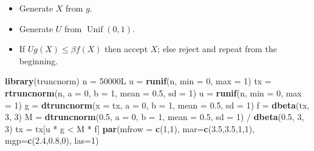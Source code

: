 \documentclass[11pt,]{article}
\newenvironment{Shaded}{\begin{snugshade}}{\end{snugshade}}
\newcommand{\KeywordTok}[1]{\textcolor[rgb]{0.13,0.29,0.53}{\textbf{{#1}}}}
\newcommand{\DataTypeTok}[1]{\textcolor[rgb]{0.13,0.29,0.53}{{#1}}}
\newcommand{\DecValTok}[1]{\textcolor[rgb]{0.00,0.00,0.81}{{#1}}}
\newcommand{\FloatTok}[1]{\textcolor[rgb]{0.00,0.00,0.81}{{#1}}}
\newcommand{\StringTok}[1]{\textcolor[rgb]{0.31,0.60,0.02}{{#1}}}
\newcommand{\NormalTok}[1]{{#1}}
\providecommand{\tightlist}{%
  \setlength{\itemsep}{0pt}\setlength{\parskip}{0pt}}
\begin{document}
\begin{itemize}
\tightlist
\item
  Generate \(X\) from \(g\).
\item
  Generate \(U\) from \(\operatorname{Unif}(0,1)\).
\item
  If \(Ug(X) \leq \beta f(X)\) then accept \(X\); else reject and repeat
  from the beginning.
\end{itemize}

\begin{Shaded}
\begin{Highlighting}[]
\KeywordTok{library}\NormalTok{(truncnorm)}
\NormalTok{n =}\StringTok{ }\NormalTok{50000L}
\NormalTok{u =}\StringTok{ }\KeywordTok{runif}\NormalTok{(n, }\DataTypeTok{min =} \DecValTok{0}\NormalTok{, }\DataTypeTok{max =} \DecValTok{1}\NormalTok{)}
\NormalTok{tx =}\StringTok{ }\KeywordTok{rtruncnorm}\NormalTok{(n, }\DataTypeTok{a =} \DecValTok{0}\NormalTok{, }\DataTypeTok{b =} \DecValTok{1}\NormalTok{, }\DataTypeTok{mean =} \FloatTok{0.5}\NormalTok{, }\DataTypeTok{sd =} \DecValTok{1}\NormalTok{)}
\NormalTok{u =}\StringTok{ }\KeywordTok{runif}\NormalTok{(n, }\DataTypeTok{min =} \DecValTok{0}\NormalTok{, }\DataTypeTok{max =} \DecValTok{1}\NormalTok{)}
\NormalTok{g =}\StringTok{ }\KeywordTok{dtruncnorm}\NormalTok{(}\DataTypeTok{x =} \NormalTok{tx, }\DataTypeTok{a =} \DecValTok{0}\NormalTok{, }\DataTypeTok{b =} \DecValTok{1}\NormalTok{, }\DataTypeTok{mean =} \FloatTok{0.5}\NormalTok{, }\DataTypeTok{sd =} \DecValTok{1}\NormalTok{)}
\NormalTok{f =}\StringTok{ }\KeywordTok{dbeta}\NormalTok{(tx, }\DecValTok{3}\NormalTok{, }\DecValTok{3}\NormalTok{)}
\NormalTok{M =}\StringTok{ }\KeywordTok{dtruncnorm}\NormalTok{(}\FloatTok{0.5}\NormalTok{, }\DataTypeTok{a =} \DecValTok{0}\NormalTok{, }\DataTypeTok{b =} \DecValTok{1}\NormalTok{, }\DataTypeTok{mean =} \FloatTok{0.5}\NormalTok{, }\DataTypeTok{sd =} \DecValTok{1}\NormalTok{) /}\StringTok{ }\KeywordTok{dbeta}\NormalTok{(}\FloatTok{0.5}\NormalTok{, }\DecValTok{3}\NormalTok{, }\DecValTok{3}\NormalTok{)}
\NormalTok{tx =}\StringTok{ }\NormalTok{tx[u *}\StringTok{ }\NormalTok{g <}\StringTok{ }\NormalTok{M *}\StringTok{ }\NormalTok{f]}
\KeywordTok{par}\NormalTok{(}\DataTypeTok{mfrow =} \KeywordTok{c}\NormalTok{(}\DecValTok{1}\NormalTok{,}\DecValTok{1}\NormalTok{), }\DataTypeTok{mar=}\KeywordTok{c}\NormalTok{(}\FloatTok{3.5}\NormalTok{,}\FloatTok{3.5}\NormalTok{,}\DecValTok{1}\NormalTok{,}\DecValTok{1}\NormalTok{), }\DataTypeTok{mgp=}\KeywordTok{c}\NormalTok{(}\FloatTok{2.4}\NormalTok{,}\FloatTok{0.8}\NormalTok{,}\DecValTok{0}\NormalTok{), }\DataTypeTok{las=}\DecValTok{1}\NormalTok{)}

\end{Highlighting}
\end{Shaded}
\end{document}
